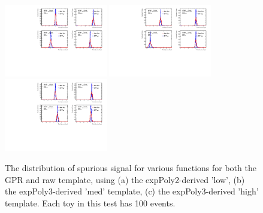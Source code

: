 \begin{figure} 
\begin{center}
  \includegraphics[width=0.4\textwidth]{figures/background/gpr/validation/nominal/ToyTest_FitSigVals_lowpT_100_noSig}   
  \includegraphics[width=0.4\textwidth]{figures/background/gpr/validation/nominal/ToyTest_FitSigVals_medpT_100_noSig}   
  \includegraphics[width=0.4\textwidth]{figures/background/gpr/validation/nominal/ToyTest_FitSigVals_highpT_100_noSig}   
\caption{The distribution of spurious signal for various functions for both the GPR and raw template, using (a) the expPoly2-derived 'low', (b) the expPoly3-derived 'med' template, (c) the expPoly3-derived 'high' template. Each toy in this test has 100 events.}
\label{fig:lowpt_100_noSig}
\end{center}
\end{figure}


